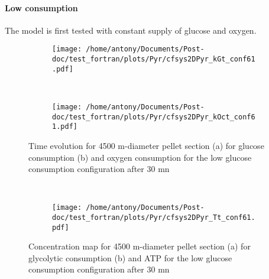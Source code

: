 \documentclass[11pt,a4paper]{article}
\begin{document}
\paragraph{Low consumption}
The model is first tested with constant supply  of glucose and oxygen.

\begin{figure}[ht!]
	\begin{subfigure}{0.45\textwidth}
	\centering
	\texttt{[image: /home/antony/Documents/Post-doc/test\_fortran/plots/Pyr/cfsys2DPyr\_kGt\_conf61.pdf]}
	\caption{ \label{PkGt_con61}}
	\end{subfigure}
	~~
	\begin{subfigure}{0.45\textwidth}
	\texttt{[image: /home/antony/Documents/Post-doc/test\_fortran/plots/Pyr/cfsys2DPyr\_kOct\_conf61.pdf]}
		\caption{ \label{PkOt_conf61}}
	\end{subfigure}
	\caption{Time evolution for 4500 \textmu m-diameter pellet section  (a) for glucose consumption (b) and oxygen consumption \label{Pconf61} for the low glucose consumption configuration after 30 mn }
\end{figure}

\begin{figure}[ht!]
	\begin{subfigure}{0.45\textwidth}
	\centering
	\caption{ \label{PkGy_con61}}
	\end{subfigure}
	~~
	\begin{subfigure}{0.45\textwidth}
	\texttt{[image: /home/antony/Documents/Post-doc/test\_fortran/plots/Pyr/cfsys2DPyr\_Tt\_conf61.pdf]}
		\caption{ \label{PT_conf61}}
	\end{subfigure}
	\caption{Concentration map for 4500 \textmu m-diameter pellet section  (a) for glycolytic consumption (b) and ATP \label{Pconf61} for the low glucose consumption configuration after 30 mn}
\end{figure}
\end{document}

